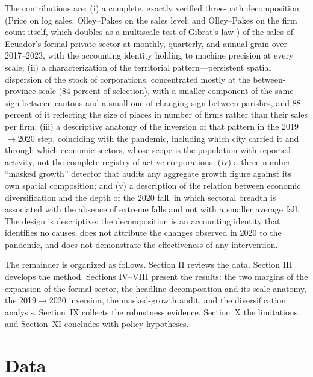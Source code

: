 \documentclass[conference]{IEEEtran}
\begin{document}
The contributions are: (i) a complete, exactly verified three-path
decomposition (Price on log sales; Olley--Pakes on the sales level; and
Olley--Pakes on the firm count itself, which doubles as a multiscale test
of Gibrat's law \cite{gibrat1931,sutton1997}) of the sales of Ecuador's
formal private sector at monthly, quarterly, and annual grain over
2017--2023, with the accounting identity holding to machine precision at
every scale; (ii) a characterization of the territorial
pattern---persistent spatial dispersion of the stock of corporations, concentrated
mostly at the between-province scale (84 percent of selection), with a
smaller component of the same sign between cantons and a small one of
changing sign between parishes, and 88 percent of it reflecting the size
of places in number of firms rather than their sales per firm; (iii) a
descriptive anatomy of the inversion of that pattern in the 2019$\to$2020
step, coinciding with the pandemic, including which city carried it and
through which economic sectors, whose scope is the population with reported activity, not the complete
registry of active corporations; (iv) a three-number ``masked growth''
detector that audits any aggregate growth figure against its own spatial
composition; and (v) a description of the relation between economic
diversification and the depth of the 2020 fall, in which sectoral breadth
is associated with the absence of extreme falls and not with a smaller
average fall. The design is descriptive: the decomposition is an
accounting identity that identifies no causes, does not attribute the
changes observed in 2020 to the pandemic, and does not demonstrate the
effectiveness of any intervention.

The remainder is organized as follows. Section II reviews the data.
Section III develops the method. Sections IV--VIII present the results:
the two margins of the expansion of the formal sector, the headline decomposition and
its scale anatomy, the 2019$\to$2020 inversion, the masked-growth audit,
and the diversification analysis. Section~IX collects the robustness
evidence, Section~X the limitations, and Section~XI concludes with policy
hypotheses.

\section{Data}
\end{document}
